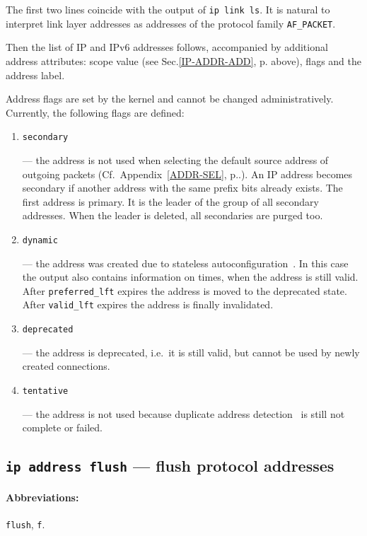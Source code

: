 The first two lines coincide with the output of \verb|ip link ls|.
It is natural to interpret link layer addresses
as addresses of the protocol family \verb|AF_PACKET|.

Then the list of IP and IPv6 addresses follows, accompanied by
additional address attributes: scope value (see Sec.\ref{IP-ADDR-ADD},
p.\pageref{IP-ADDR-ADD} above), flags and the address label.

Address flags are set by the kernel and cannot be changed
administratively. Currently, the following flags are defined:

\begin{enumerate}
\item \verb|secondary|

--- the address is not used when selecting the default source address
of outgoing packets (Cf.\ Appendix~\ref{ADDR-SEL}, p.\pageref{ADDR-SEL}.).
An IP address becomes secondary if another address with the same
prefix bits already exists. The first address is primary.
It is the leader of the group of all secondary addresses. When the leader
is deleted, all secondaries are purged too.


\item \verb|dynamic|

--- the address was created due to stateless autoconfiguration~\cite{RFC-ADDRCONF}.
In this case the output also contains information on times, when
the address is still valid. After \verb|preferred_lft| expires the address is
moved to the deprecated state. After \verb|valid_lft| expires the address
is finally invalidated.

\item \verb|deprecated|

--- the address is deprecated, i.e.\ it is still valid, but cannot
be used by newly created connections.

\item \verb|tentative|

--- the address is not used because duplicate address detection~\cite{RFC-ADDRCONF}
is still not complete or failed.

\end{enumerate}


\subsection{{\tt ip address flush} --- flush protocol addresses}
\label{IP-ADDR-FLUSH}

\paragraph{Abbreviations:} \verb|flush|, \verb|f|.

